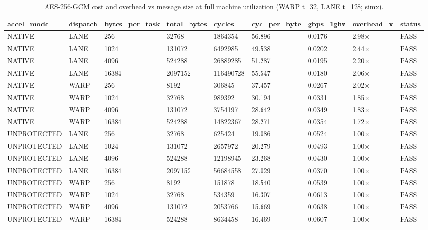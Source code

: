 \begin{table}[t]
\centering
\caption{AES-256-GCM cost and overhead vs message size at full machine utilization (WARP t=32, LANE t=128; simx).}
\label{tab:gcm_size_sweep}
\begin{tabular}{lllllllll}
\toprule
accel\_mode & dispatch & bytes\_per\_task & total\_bytes & cycles & cyc\_per\_byte & gbps\_1ghz & overhead\_x & status \\
\midrule
NATIVE & LANE & 256 & 32768 & 1864354 & 56.896 & 0.0176 & 2.98$\times$ & PASS \\
NATIVE & LANE & 1024 & 131072 & 6492985 & 49.538 & 0.0202 & 2.44$\times$ & PASS \\
NATIVE & LANE & 4096 & 524288 & 26889285 & 51.287 & 0.0195 & 2.20$\times$ & PASS \\
NATIVE & LANE & 16384 & 2097152 & 116490728 & 55.547 & 0.0180 & 2.06$\times$ & PASS \\
NATIVE & WARP & 256 & 8192 & 306845 & 37.457 & 0.0267 & 2.02$\times$ & PASS \\
NATIVE & WARP & 1024 & 32768 & 989392 & 30.194 & 0.0331 & 1.85$\times$ & PASS \\
NATIVE & WARP & 4096 & 131072 & 3754197 & 28.642 & 0.0349 & 1.83$\times$ & PASS \\
NATIVE & WARP & 16384 & 524288 & 14822367 & 28.271 & 0.0354 & 1.72$\times$ & PASS \\
UNPROTECTED & LANE & 256 & 32768 & 625424 & 19.086 & 0.0524 & 1.00$\times$ & PASS \\
UNPROTECTED & LANE & 1024 & 131072 & 2657972 & 20.279 & 0.0493 & 1.00$\times$ & PASS \\
UNPROTECTED & LANE & 4096 & 524288 & 12198945 & 23.268 & 0.0430 & 1.00$\times$ & PASS \\
UNPROTECTED & LANE & 16384 & 2097152 & 56684558 & 27.029 & 0.0370 & 1.00$\times$ & PASS \\
UNPROTECTED & WARP & 256 & 8192 & 151878 & 18.540 & 0.0539 & 1.00$\times$ & PASS \\
UNPROTECTED & WARP & 1024 & 32768 & 534359 & 16.307 & 0.0613 & 1.00$\times$ & PASS \\
UNPROTECTED & WARP & 4096 & 131072 & 2053766 & 15.669 & 0.0638 & 1.00$\times$ & PASS \\
UNPROTECTED & WARP & 16384 & 524288 & 8634458 & 16.469 & 0.0607 & 1.00$\times$ & PASS \\
\bottomrule
\end{tabular}
\end{table}


